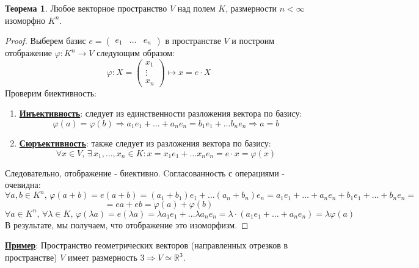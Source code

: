 \documentclass[12pt]{article}
\newcommand{\MR}{\mathbb{R}}
\theoremstyle{definition}
\newtheorem{theorem}{Теорема}
\begin{document}
\begin{theorem}
	Любое векторное пространство $V$ над полем $K$, размерности $n < \infty$ изоморфно $K^n$.
\end{theorem}
\begin{proof}
	Выберем базис $e = \begin{pmatrix}
		e_1 & \dotsc & e_n
	\end{pmatrix}$ в пространстве $V$ и построим отображение $\varphi \colon K^n \to V$ следующим образом:
	$$
		\varphi \colon X = \begin{pmatrix}
				x_1 \\
				\vdots\\
				x_n
			\end{pmatrix} \mapsto x = e{\cdot}X
	$$
	Проверим биективность:
	\begin{enumerate}[label=\arabic*)]
		\item \textbf{\uline{Инъективность}}: следует из единственности разложения вектора по базису:
		$$
			\varphi(a) = \varphi(b) \Rightarrow a_1 e_1 + \dotsc + a_n e_n = b_1 e_1 + \dotsc b_n e_n \Rightarrow a = b
		$$
		\item 	\textbf{\uline{Сюръективность}}: также следует из разложения вектора по базису:
		$$
			\forall x \in V, \, \exists \, x_1, \dotsc, x_n \in K \colon x = x_1 e_1 + \dotsc x_n e_n = e{\cdot}x = \varphi(x)
		$$
	\end{enumerate}
	Следовательно, отображение - биективно. Cогласованность с операциями - очевидна:
	$$
		\forall a,b \in K^n, \, \varphi(a + b) = e(a + b) = (a_1 + b_1)e_1 + \dotsc (a_n + b_n)e_n = a_1 e_1 + \dotsc + a_n e_n + b_1 e_1 + \dotsc + b_n e_n =
	$$
	$$
		= ea + eb = \varphi(a) + \varphi(b)
	$$
	$$
		\forall a \in K^n, \, \forall \lambda \in K, \, \varphi(\lambda a) = e(\lambda a) = \lambda a_1 e_1 + \dotsc \lambda a_n e_n = \lambda{\cdot}(a_1 e_1 + \dotsc + a_n e_n) = \lambda \varphi(a)
	$$
	В результате, мы получаем, что отображение это изоморфизм.
\end{proof}

\textbf{\uline{Пример}}: Пространство геометрических векторов (направленных отрезков в пространстве) $V$ имеет размерность $3 \Rightarrow V \simeq \MR^3$.
\end{document}
